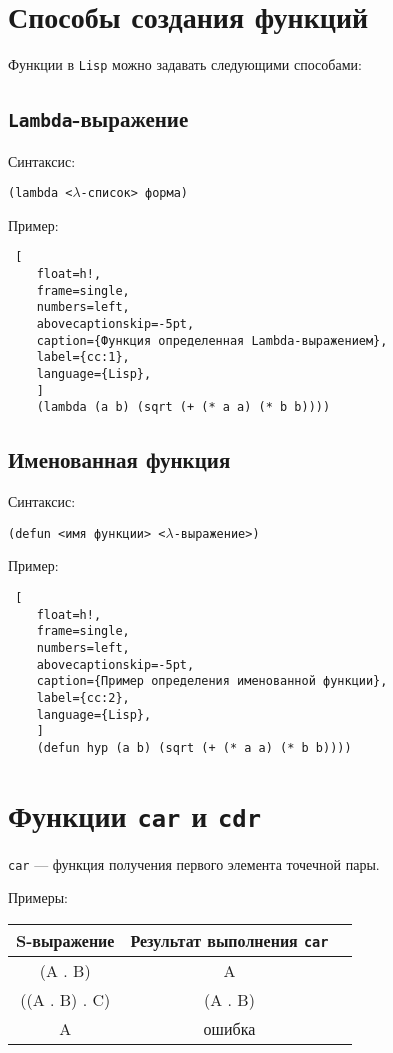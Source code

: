 \section{Способы создания функций}

Функции в \texttt{Lisp} можно задавать следующими способами:

\subsection*{\texttt{Lambda}-выражение}

Синтаксис:

\texttt{(lambda <$\lambda$-список> форма)}

Пример:

\begin{lstlisting} [
	float=h!,
	frame=single,
	numbers=left,
	abovecaptionskip=-5pt,
	caption={Функция определенная Lambda-выражением},
	label={cc:1},
	language={Lisp},
	]
	(lambda (a b) (sqrt (+ (* a a) (* b b))))
\end{lstlisting}

\subsection*{Именованная функция}

Синтаксис:

\texttt{(defun <имя функции> <$\lambda$-выражение>)}

Пример:

\begin{lstlisting} [
	float=h!,
	frame=single,
	numbers=left,
	abovecaptionskip=-5pt,
	caption={Пример определения именованной функции},
	label={cc:2},
	language={Lisp},
	]
	(defun hyp (a b) (sqrt (+ (* a a) (* b b))))
\end{lstlisting}

\section{Функции \texttt{car} и \texttt{cdr}}

\texttt{car} --- функция получения первого элемента точечной пары.

Примеры:

\begin{table}[!ht]
	\small
	\begin{center}
		\begin{tabular}{|c|c|c|}
			\hline
			\bfseries S-выражение & \bfseries Результат выполнения \texttt{car} \\\hline
			(A . B) & A \\\hline
			((A . B) . C) & (A . B) \\\hline
			A & ошибка \\\hline
		\end{tabular}
	\end{center}
\end{table}

